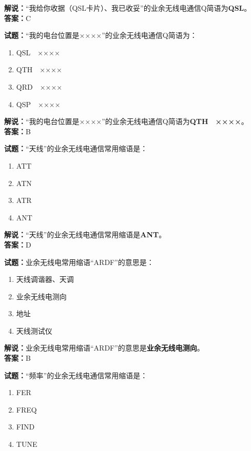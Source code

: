 \documentclass{ctexbook}
\begin{document}
\noindent\textbf{解说：}“我给你收据（QSL卡片）、我已收妥”的业余无线电通信Q简语为\textbf{QSL}。\\\noindent\textbf{答案：}C


\bigskip


\noindent\textbf{试题：}“我的电台位置是××××”的业余无线电通信Q简语为：

\begin{enumerate}[leftmargin=3em]
	\item QSL　××××
	\item QTH　××××
	\item QRD　××××
	\item QSP　××××
\end{enumerate}

\noindent\textbf{解说：}“我的电台位置是××××”的业余无线电通信Q简语为\textbf{QTH　××××}。\\\noindent\textbf{答案：}B


\bigskip


\noindent\textbf{试题：}“天线”的业余无线电通信常用缩语是：

\begin{enumerate}[leftmargin=3em]
	\item ATT
	\item ATN
	\item ATR
	\item ANT
\end{enumerate}

\noindent\textbf{解说：}“天线”的业余无线电通信常用缩语是\textbf{ANT}。\\\noindent\textbf{答案：}D


\bigskip


\noindent\textbf{试题：}业余无线电常用缩语“ARDF”的意思是：

\begin{enumerate}[leftmargin=3em]
	\item 天线调谐器、天调
	\item 业余无线电测向
	\item 地址
	\item 天线测试仪
\end{enumerate}

\noindent\textbf{解说：}业余无线电常用缩语“ARDF”的意思是\textbf{业余无线电测向}。\\\noindent\textbf{答案：}B


\bigskip


\noindent\textbf{试题：}“频率”的业余无线电通信常用缩语是：
\begin{enumerate}[leftmargin=3em]
	\item FER
	\item FREQ
	\item FIND
	\item TUNE
\end{enumerate}
\end{document}

